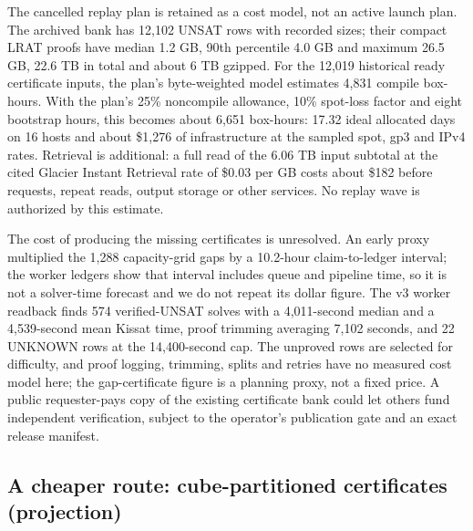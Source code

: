 \documentclass{anvil-paper}
\theoremstyle{definition}
\begin{document}
The cancelled replay plan is retained as a cost model, not an active launch plan. The archived bank has 12,102 UNSAT rows with recorded sizes; their compact LRAT proofs have median 1.2 GB, 90th percentile 4.0 GB and maximum 26.5 GB, 22.6 TB in total and about 6 TB gzipped. For the 12,019 historical ready certificate inputs, the plan's byte-weighted model estimates 4,831 compile box-hours. With the plan's 25\% noncompile allowance, 10\% spot-loss factor and eight bootstrap hours, this becomes about 6,651 box-hours: 17.32 ideal allocated days on 16 hosts and about \$1,276 of infrastructure at the sampled spot, gp3 and IPv4 rates. Retrieval is additional: a full read of the 6.06 TB input subtotal at the cited Glacier Instant Retrieval rate of \$0.03 per GB costs about \$182 before requests, repeat reads, output storage or other services. No replay wave is authorized by this estimate.

The cost of producing the missing certificates is unresolved. An early proxy multiplied the 1,288 capacity-grid gaps by a 10.2-hour claim-to-ledger interval; the worker ledgers show that interval includes queue and pipeline time, so it is not a solver-time forecast and we do not repeat its dollar figure. The v3 worker readback finds 574 verified-UNSAT solves with a 4,011-second median and a 4,539-second mean Kissat time, proof trimming averaging 7,102 seconds, and 22 UNKNOWN rows at the 14,400-second cap. The unproved rows are selected for difficulty, and proof logging, trimming, splits and retries have no measured cost model here; the gap-certificate figure is a planning proxy, not a fixed price. A public requester-pays copy of the existing certificate bank could let others fund independent verification, subject to the operator's publication gate and an exact release manifest.

\subsection{A cheaper route: cube-partitioned certificates (projection)}\label{sec:cube}
\end{document}

